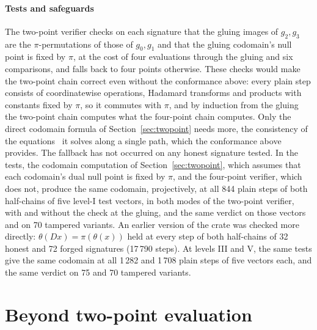 \documentclass[version=preprint]{iacrcc}
\begin{document}
    \paragraph{Tests and safeguards}
    The two-point verifier checks on each signature that the gluing images of
    $g_2, g_3$ are the $\pi$-permutations of those of $g_0, g_1$ and that the
    gluing codomain's null point is fixed by $\pi$, at the cost of four
    evaluations through the gluing and six comparisons, and falls back to four
    points otherwise. These checks would make the two-point chain correct even
    without the conformance above: every plain step consists of coordinatewise
    operations, Hadamard transforms and products with constants fixed by $\pi$,
    so it commutes with $\pi$, and by induction from the gluing the two-point
    chain computes what the four-point chain computes. Only the direct codomain
    formula of Section~\ref{sec:twopoint} needs more, the consistency of the
    equations~\cite[Eq.~(21)]{Dar24} it solves along a single path, which the
    conformance above provides. The
    fallback has not occurred on any honest signature tested. In the tests, the
    codomain computation of Section~\ref{sec:twopoint}, which assumes that each
    codomain's dual null point is fixed by $\pi$, and the four-point verifier,
    which does not, produce the same codomain, projectively, at all 844
    plain steps of both half-chains of five level-I test vectors, in both
    modes of the two-point verifier, with and without the check at the gluing, and the same
    verdict on those vectors and on 70 tampered variants. An earlier version of
    the crate was checked more directly: $\theta(Dx) = \pi(\theta(x))$ held at
    every step of both half-chains of 32 honest and 72 forged signatures
    (17\,790 steps). At levels III and V, the same tests give the same codomain at all
    1\,282 and 1\,708 plain steps of five vectors each, and the same verdict on 75 and 70 tampered variants.

    \section{Beyond two-point evaluation}
    \label{app:beyond}
\end{document}
